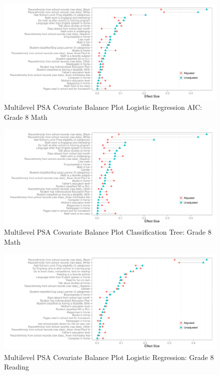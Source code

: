 \begin{figure}[h!]
\begin{center}
\includegraphics[width=\textwidth]{../Figures2009/g8math-mlpsa-lrAIC-balance.pdf}
\caption{Multilevel PSA Covariate Balance Plot Logistic Regression AIC: Grade 8 Math}
\end{center}
\end{figure}

\begin{figure}[h!]
\begin{center}
\includegraphics[width=\textwidth]{../Figures2009/g8math-mlpsa-ctree-balance.pdf}
\caption{Multilevel PSA Covariate Balance Plot Classification Tree: Grade 8 Math}
\end{center}
\end{figure}

\begin{figure}[h!]
\begin{center}
\includegraphics[width=\textwidth]{../Figures2009/g8read-mlpsa-lr-balance.pdf}
\caption{Multilevel PSA Covariate Balance Plot Logistic Regression: Grade 8 Reading}
\end{center}
\end{figure}

